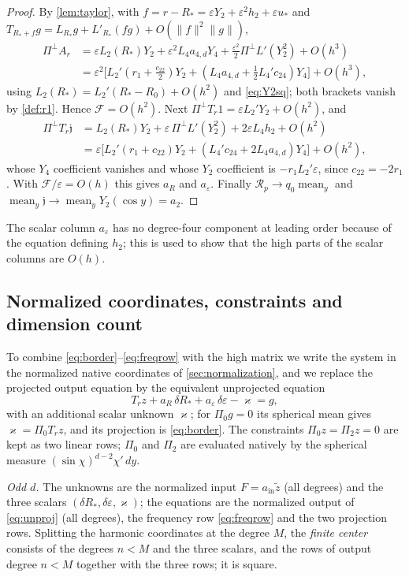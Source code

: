 \documentclass[11pt]{amsart}
\numberwithin{equation}{section}
\theoremstyle{definition}
\theoremstyle{remark}
\newcommand{\eps}{\varepsilon}
\newcommand{\norm}[1]{\lVert #1\rVert}
\newcommand{\mean}{\operatorname{mean}}
\newcommand{\cR}{\mathcal R}
\newcommand{\cF}{\mathcal F}
\begin{document}
\begin{proof}
By \cref{lem:taylor}, with $f=r-R_*=\eps Y_2+\eps^2h_2+\eps u_*$ and $T_{R_*+f}g=L_{R_*}g+L'_{R_*}(fg)+O(\norm f^2\norm g)$,
\begin{align*}
\Pi^\perp A_r&=\eps L_2(R_*)Y_2+\eps^2L_4a_{4,d}Y_4+\tfrac{\eps^2}2\Pi^\perp L'(Y_2^2)+O(h^3)\\
&=\eps^2\bigl[L_2'(r_1+\tfrac{c_{22}}2)Y_2+(L_4a_{4,d}+\tfrac12L_4'c_{24})Y_4\bigr]+O(h^3),
\end{align*}
using $L_2(R_*)=L_2'(R_*-R_0)+O(h^2)$ and \eqref{eq:Y2sq}; both brackets vanish by \cref{def:r1}. Hence $\cF=O(h^2)$. Next $\Pi^\perp T_r1=\eps L_2'Y_2+O(h^2)$, and
\begin{align*}
\Pi^\perp T_r\mathfrak j&=L_2(R_*)Y_2+\eps\,\Pi^\perp L'(Y_2^2)+2\eps L_4h_2+O(h^2)\\
&=\eps\bigl[L_2'(r_1+c_{22})Y_2+(L_4'c_{24}+2L_4a_{4,d})Y_4\bigr]+O(h^2),
\end{align*}
whose $Y_4$ coefficient vanishes and whose $Y_2$ coefficient is $-r_1L_2'\eps$, since $c_{22}=-2r_1$. With $\cF/\eps=O(h)$ this gives $a_R$ and $a_\eps$. Finally $\cR_p\to q_0\mean_y$ and $\mean_y\mathfrak j\to\mean_yY_2(\cos y)=a_2$.
\end{proof}

The scalar column $a_\eps$ has no degree-four component at leading order because of the equation defining $h_2$; this is used to show that the high parts of the scalar columns are $O(h)$.

\subsection{Normalized coordinates, constraints and dimension count}
To combine \eqref{eq:border}--\eqref{eq:freqrow} with the high matrix we write the system in the normalized native coordinates of \cref{sec:normalization}, and we replace the projected output equation by the equivalent unprojected equation
\begin{equation}\label{eq:unproj}
T_rz+a_R\,\delta R_*+a_\eps\,\delta\eps-\varkappa=g,
\end{equation}
with an additional scalar unknown $\varkappa$; for $\Pi_0g=0$ its spherical mean gives $\varkappa=\Pi_0T_rz$, and its projection is \eqref{eq:border}. The constraints $\Pi_0z=\Pi_2z=0$ are kept as two linear rows; $\Pi_0$ and $\Pi_2$ are evaluated natively by the spherical measure $(\sin\chi)^{d-2}\chi'\,dy$.

\emph{Odd $d$.} The unknowns are the normalized input $F=a_{\mathrm{in}}\tilde z$ (all degrees) and the three scalars $(\delta R_*,\delta\eps,\varkappa)$; the equations are the normalized output of \eqref{eq:unproj} (all degrees), the frequency row \eqref{eq:freqrow} and the two projection rows. Splitting the harmonic coordinates at the degree $M$, the \emph{finite center} consists of the degrees $n<M$ and the three scalars, and the rows of output degree $n<M$ together with the three rows; it is square.
\end{document}
